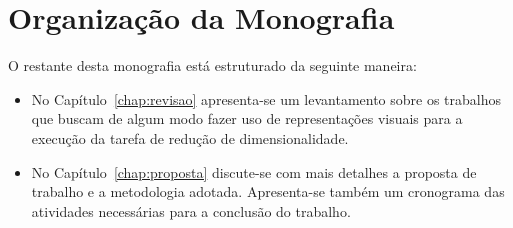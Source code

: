 

\section{Organização da Monografia}

O restante desta monografia está estruturado da seguinte maneira:

\begin{itemize}
        
  \item No Capítulo~\ref{chap:revisao} apresenta-se um levantamento sobre os trabalhos que buscam de algum modo fazer uso de representações visuais para a execução da tarefa de redução de dimensionalidade. 

  \item No Capítulo~\ref{chap:proposta} discute-se com mais detalhes a proposta de trabalho e a metodologia adotada. Apresenta-se também um cronograma das atividades necessárias para a conclusão do trabalho.

\end{itemize}

